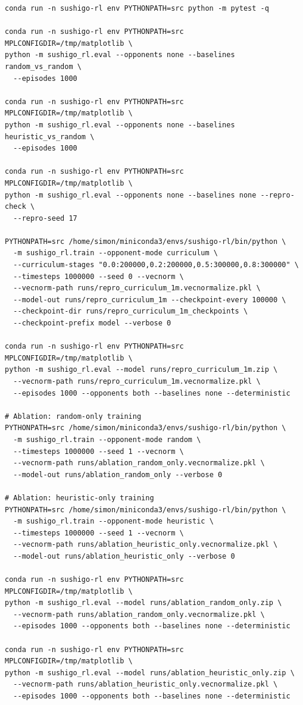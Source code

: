 \documentclass[10pt]{article}
\begin{document}
\begin{verbatim}
conda run -n sushigo-rl env PYTHONPATH=src python -m pytest -q

conda run -n sushigo-rl env PYTHONPATH=src MPLCONFIGDIR=/tmp/matplotlib \
python -m sushigo_rl.eval --opponents none --baselines random_vs_random \
  --episodes 1000

conda run -n sushigo-rl env PYTHONPATH=src MPLCONFIGDIR=/tmp/matplotlib \
python -m sushigo_rl.eval --opponents none --baselines heuristic_vs_random \
  --episodes 1000

conda run -n sushigo-rl env PYTHONPATH=src MPLCONFIGDIR=/tmp/matplotlib \
python -m sushigo_rl.eval --opponents none --baselines none --repro-check \
  --repro-seed 17

PYTHONPATH=src /home/simon/miniconda3/envs/sushigo-rl/bin/python \
  -m sushigo_rl.train --opponent-mode curriculum \
  --curriculum-stages "0.0:200000,0.2:200000,0.5:300000,0.8:300000" \
  --timesteps 1000000 --seed 0 --vecnorm \
  --vecnorm-path runs/repro_curriculum_1m.vecnormalize.pkl \
  --model-out runs/repro_curriculum_1m --checkpoint-every 100000 \
  --checkpoint-dir runs/repro_curriculum_1m_checkpoints \
  --checkpoint-prefix model --verbose 0

conda run -n sushigo-rl env PYTHONPATH=src MPLCONFIGDIR=/tmp/matplotlib \
python -m sushigo_rl.eval --model runs/repro_curriculum_1m.zip \
  --vecnorm-path runs/repro_curriculum_1m.vecnormalize.pkl \
  --episodes 1000 --opponents both --baselines none --deterministic

# Ablation: random-only training
PYTHONPATH=src /home/simon/miniconda3/envs/sushigo-rl/bin/python \
  -m sushigo_rl.train --opponent-mode random \
  --timesteps 1000000 --seed 1 --vecnorm \
  --vecnorm-path runs/ablation_random_only.vecnormalize.pkl \
  --model-out runs/ablation_random_only --verbose 0

# Ablation: heuristic-only training
PYTHONPATH=src /home/simon/miniconda3/envs/sushigo-rl/bin/python \
  -m sushigo_rl.train --opponent-mode heuristic \
  --timesteps 1000000 --seed 1 --vecnorm \
  --vecnorm-path runs/ablation_heuristic_only.vecnormalize.pkl \
  --model-out runs/ablation_heuristic_only --verbose 0

conda run -n sushigo-rl env PYTHONPATH=src MPLCONFIGDIR=/tmp/matplotlib \
python -m sushigo_rl.eval --model runs/ablation_random_only.zip \
  --vecnorm-path runs/ablation_random_only.vecnormalize.pkl \
  --episodes 1000 --opponents both --baselines none --deterministic

conda run -n sushigo-rl env PYTHONPATH=src MPLCONFIGDIR=/tmp/matplotlib \
python -m sushigo_rl.eval --model runs/ablation_heuristic_only.zip \
  --vecnorm-path runs/ablation_heuristic_only.vecnormalize.pkl \
  --episodes 1000 --opponents both --baselines none --deterministic
\end{verbatim}
\end{document}
